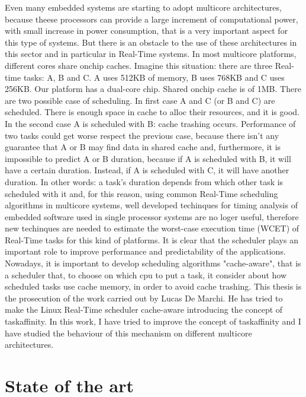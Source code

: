 Even many embedded systems are starting to adopt multicore architectures, because theese processors can provide a large increment of computational power,
with small increase in power consumption, that is a very important aspect for this type of systems.
But there is an obstacle to the use of these architectures in this sector and in particular in Real-Time systems.
In most multicore platforms, different cores share onchip caches. Imagine this situation: there are three Real-time tasks: A, B and C. 
A uses 512KB of memory, B uses 768KB and C uses 256KB. Our platform has a dual-core chip. Shared onchip cache is of 1MB.
There are two possible case of scheduling. In first case A and C (or B and C) are scheduled. There is enough space in cache to alloc their resources, 
and it is good. In the second case A is scheduled with B: cache trashing occurs. Performance of two tasks could get worse respect the previous case, because 
there isn't any guarantee that A or B may find data in shared cache and, furthermore, it is impossible to predict A or B duration, because if A is 
scheduled with B, it will have a certain duration. Instead, if A is scheduled with C, it will have another duration.
In other words: a task's duration depends from which other task is scheduled with it and, for this reason, using common Real-Time scheduling algorithms in 
multicore systems, well developed techinques for timing analysis of embedded software used in single processor systems are no loger useful, therefore 
new techinques are needed to estimate the worst-case execution time (WCET) of Real-Time tasks for this kind of platforms. 
It is clear that the scheduler plays an important role to improve performance and predictability of the applications. Nowadays, it is 
important to develop scheduling algorithms "cache-aware", that is a scheduler
that, to choose on which cpu to put a task, it consider  about how scheduled 
tasks use cache memory, in order to avoid cache trashing.
This thesis is the prosecution of the work carried out by Lucas De Marchi. He has tried to make the Linux Real-Time scheduler cache-aware
introducing the concept of taskaffinity. In this work, I have tried to improve the concept of taskaffinity and I 
have studied the behaviour of this mechanism on different multicore architectures.

\section{State of the art}
\label{sec:StateOfTheArt}

